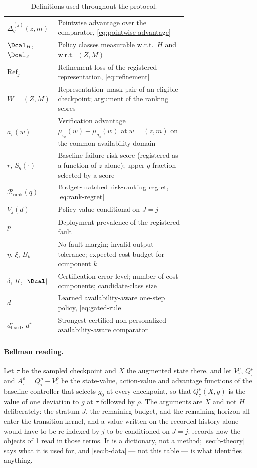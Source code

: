 \begin{table}[H]
\begin{tabular}{@{}lp{0.72\linewidth}@{}}
$\Delta^{(j)}_g(z,m)$ & Pointwise advantage over the comparator, \eqref{eq:pointwise-advantage} \\
$\Dcal_H$, $\Dcal_Z$ & Policy classes measurable w.r.t.\ $H$ and w.r.t.\ $(Z,M)$ \\
$\mathrm{Ref}_j$ & Refinement loss of the registered representation, \eqref{eq:refinement} \\
$W=(Z,M)$ & Representation--mask pair of an eligible checkpoint; argument of the ranking scores \\
$a_v(w)$ & Verification advantage $\mu_{g_v}(w)-\mu_{g_0}(w)$ at $w=(z,m)$ on the common-availability domain \\
$r$, $S_q(\cdot)$ & Baseline failure-risk score (registered as a function of $z$ alone); upper $q$-fraction selected by a score \\
$\mathcal R_{\mathrm{rank}}(q)$ & Budget-matched risk-ranking regret, \eqref{eq:rank-regret} \\
$V_j(d)$ & Policy value conditional on $J=j$ \\
$p$ & Deployment prevalence of the registered fault \\
$\eta$, $\xi$, $B_k$ & No-fault margin; invalid-output tolerance; expected-cost budget for component $k$ \\
$\delta$, $K$, $|\Dcal|$ & Certification error level; number of cost components; candidate-class size \\
$d^\dagger$ & Learned availability-aware one-step policy, \eqref{eq:gated-rule} \\
$d^\star_{\mathrm{fixed}}$, $d^\star$ & Strongest certified non-personalized availability-aware comparator \\
\bottomrule
\end{tabular}
\caption{Definitions used throughout the protocol.}
\label{tab:notation}
\end{table}

\paragraph{Bellman reading.}
Let $\tau$ be the sampled checkpoint and $X$ the augmented state there, and let
$V^\rho_\tau$, $Q^\rho_\tau$ and $A^\rho_\tau=Q^\rho_\tau-V^\rho_\tau$ be the
state-value, action-value and advantage functions of the baseline controller
that selects $g_0$ at every checkpoint, so that $Q^\rho_\tau(X,g)$ is the value
of one deviation to $g$ at $\tau$ followed by $\rho$.  The arguments are $X$ and
not $H$ deliberately: the stratum $J$, the remaining budget, and the remaining
horizon all enter the transition kernel, and a value written on the recorded
history alone would have to be re-indexed by $j$ to be conditioned on $J=j$.
 records how the objects of \cref{tab:notation}
read in those terms.  It is a dictionary, not a method; \cref{sec:b-theory} says
what it is used for, and \cref{sec:b-data} --- not this table --- is what
identifies anything.

